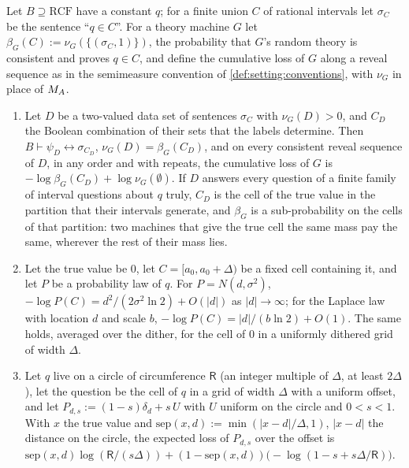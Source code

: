 \begin{proposition}\label{prop:laws:partition}
Let $B\supseteq\mathrm{RCF}$ have a constant $q$; for a finite union $C$ of rational intervals let $\sigma_C$ be the sentence ``$q\in C$''. For a theory machine $G$ let $\beta_G(C):=\nu_G(\{(\sigma_C,1)\})$, the probability that $G$'s random theory is consistent and proves $q\in C$, and define the cumulative loss of $G$ along a reveal sequence as in the semimeasure convention of \cref{def:setting:conventions}, with $\nu_G$ in place of $M_{A}$.
\begin{enumerate}[label=(\alph*),itemsep=1pt,topsep=2pt]
\item Let $D$ be a two-valued data set of sentences $\sigma_C$ with $\nu_G(D)>0$, and $C_D$ the Boolean combination of their sets that the labels determine. Then $B\vdash\psi_D\leftrightarrow\sigma_{C_D}$, $\nu_G(D)=\beta_G(C_D)$, and on every consistent reveal sequence of $D$, in any order and with repeats, the cumulative loss of $G$ is $-\log\beta_G(C_D)+\log\nu_G(\emptyset)$. If $D$ answers every question of a finite family of interval questions about $q$ truly, $C_D$ is the cell of the true value in the partition that their intervals generate, and $\beta_G$ is a sub-probability on the cells of that partition: two machines that give the true cell the same mass pay the same, wherever the rest of their mass lies.
\item Let the true value be $0$, let $C=[a_0,a_0+\Delta)$ be a fixed cell containing it, and let $P$ be a probability law of $q$. For $P=N(d,\sigma^2)$, $-\log P(C)=d^2/(2\sigma^2\ln2)+O(\lvert d\rvert)$ as $\lvert d\rvert\to\infty$; for the Laplace law with location $d$ and scale $b$, $-\log P(C)=\lvert d\rvert/(b\ln2)+O(1)$. The same holds, averaged over the dither, for the cell of $0$ in a uniformly dithered grid of width $\Delta$.
\item Let $q$ live on a circle of circumference $\mathsf R$ (an integer multiple of $\Delta$, at least $2\Delta$), let the question be the cell of $q$ in a grid of width $\Delta$ with a uniform offset, and let $P_{d,s}:=(1-s)\delta_d+s\,U$ with $U$ uniform on the circle and $0<s<1$. With $x$ the true value and $\mathrm{sep}(x,d):=\min(\lvert x-d\rvert/\Delta,1)$, $\lvert x-d\rvert$ the distance on the circle, the expected loss of $P_{d,s}$ over the offset is $\mathrm{sep}(x,d)\log(\mathsf R/(s\Delta))+(1-\mathrm{sep}(x,d))\big(-\log(1-s+s\Delta/\mathsf R)\big)$.
\end{enumerate}
\end{proposition}

